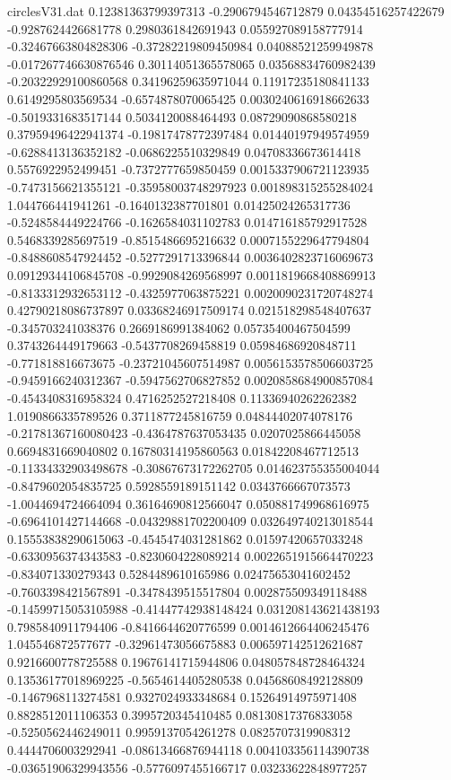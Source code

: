 \begin{filecontents}{circlesV31.dat}
0.12381363799397313	-0.2906794546712879	0.04354516257422679
-0.9287624426681778	0.2980361842691943	0.055927089158777914
-0.32467663804828306	-0.37282219809450984	0.04088521259949878
-0.017267746630876546	0.30114051365578065	0.03568834760982439
-0.20322929100860568	0.34196259635971044	0.11917235180841133
0.6149295803569534	-0.6574878070065425	0.0030240616918662633
-0.5019331683517144	0.5034120088464493	0.08729090868580218
0.37959496422941374	-0.19817478772397484	0.01440197949574959
-0.6288413136352182	-0.0686225510329849	0.04708336673614418
0.5576922952499451	-0.7372777659850459	0.0015337906721123935
-0.7473156621355121	-0.35958003748297923	0.001898315255284024
1.044766441941261	-0.1640132387701801	0.01425024265317736
-0.5248584449224766	-0.1626584031102783	0.014716185792917528
0.5468339285697519	-0.8515486695216632	0.0007155229647794804
-0.8488608547924452	-0.5277291713396844	0.0036402823716069673
0.09129344106845708	-0.9929084269568997	0.0011819668408869913
-0.8133312932653112	-0.4325977063875221	0.0020090231720748274
0.42790218086737897	0.03368246917509174	0.021518298548407637
-0.345703241038376	0.2669186991384062	0.05735400467504599
0.3743264449179663	-0.5437708269458819	0.05984686920848711
-0.771818816673675	-0.23721045607514987	0.0056153578506603725
-0.9459166240312367	-0.5947562706827852	0.0020858684900857084
-0.4543408316958324	0.4716252527218408	0.11336940262262382
1.0190866335789526	0.3711877245816759	0.04844402074078176
-0.21781367160080423	-0.4364787637053435	0.0207025866445058
0.6694831669040802	0.16780314195860563	0.01842208467712513
-0.11334332903498678	-0.30867673172262705	0.014623755355004044
-0.8479602054835725	0.5928559189151142	0.0343766667073573
-1.0044694724664094	0.36164690812566047	0.050881749968616975
-0.6964101427144668	-0.04329881702200409	0.032649740213018544
0.15553838290615063	-0.4545474031281862	0.01597420657033248
-0.6330956374343583	-0.8230604228089214	0.0022651915664470223
-0.834071330279343	0.5284489610165986	0.02475653041602452
-0.7603398421567891	-0.3478439515517804	0.002875509349118488
-0.14599715053105988	-0.41447742938148424	0.031208143621438193
0.7985840911794406	-0.8416644620776599	0.0014612664406245476
1.045546872577677	-0.32961473056675883	0.006597142512621687
0.9216600778725588	0.19676141715944806	0.048057848728464324
0.13536177018969225	-0.5654614405280538	0.04568608492128809
-0.1467968113274581	0.9327024933348684	0.15264914975971408
0.8828512011106353	0.3995720345410485	0.08130817376833058
-0.5250562446249011	0.9959137054261278	0.0825707319908312
0.4444706003292941	-0.08613466876944118	0.004103356114390738
-0.03651906329943556	-0.5776097455166717	0.03233622848977257

\end{filecontents}
